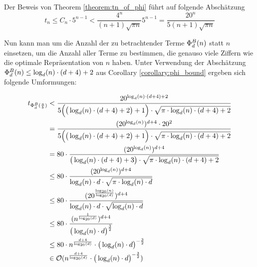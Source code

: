 \documentclass{article}
\theoremstyle{nonumberplain}
\begin{document}
Der Beweis von Theorem \ref{theorem:tn_of_phi} führt auf folgende Abschätzung
    \[t_n \leq C_n \cdot 5^{n-1} < \frac{4^n}{(n+1)\sqrt{\pi n}} 5^{n-1} =  \frac{20^n}{5(n+1)\sqrt{\pi n}}\]

Nun kann man um die Anzahl der zu betrachtender Terme \(\Phi_{d}^{B}(n)\) statt \(n\) einsetzen, um die Anzahl aller Terme zu bestimmen, die genauso viele Ziffern wie die optimale Repräsentation von \(n\) haben.
Unter Verwendung der Abschätzung \(\Phi_{d}^{B}(n) \leq \log_d(n) \cdot (d+4) + 2\) aus Corollary \ref{corollary:phi_bound} ergeben sich folgende Umformungen:

\begin{align*}
    t_{\Phi_{d}^{B}(\frac{a}{b})}
    &< \frac{20^{\log_d(n)\cdot(d+4)+2}}{5\Big(\big(\log_d(n) \cdot (d+4)+2\big)+1\Big) \cdot \sqrt{\pi \cdot \log_d(n) \cdot (d+4) + 2}} \\
    &= \frac{(20^{\log_d(n)})^{d+4}\cdot20^2}{5\Big(\big(\log_d(n) \cdot (d+4)+2\big)+1\Big) \cdot \sqrt{\pi \cdot \log_d(n) \cdot (d + 4) + 2}} \\
    &= 80\cdot\frac{(20^{\log_d(n)})^{d+4}}{\big(\log_d(n) \cdot (d+4)+3\big) \cdot\sqrt{\pi \cdot \log_d(n)\cdot(d+4)+2}} \\
    &\leq 80\cdot\frac{(20^{\log_d(n)})^{d+4}}{\log_d(n) \cdot d \cdot \sqrt{\pi \cdot \log_d(n) \cdot d}} \\
    &\leq 80\cdot\frac{(20^{\frac{\log_{20}(n)}{\log_{20}(d)}})^{d+4}}{\log_d(n) \cdot d \cdot \sqrt{\log_d(n) \cdot d}} \\
    &\leq 80\cdot\frac{(n^{\frac{1}{\log_{20}(d)}})^{d+4}}{\big(\log_d(n) \cdot d\big)^{\frac{3}{2}}} \\
    &\leq 80 \cdot n^{\frac{d+4}{\log_{20}(d)}} \cdot \big(\log_d(n) \cdot d\big)^{-\frac{3}{2}} \\
    &\in \mathcal{O}(n^{\frac{d+4}{\log_{20}(d)}} \cdot \big(\log_d(n) \cdot d\big)^{-\frac{3}{2}}) \\
\end{align*}
\end{document}
